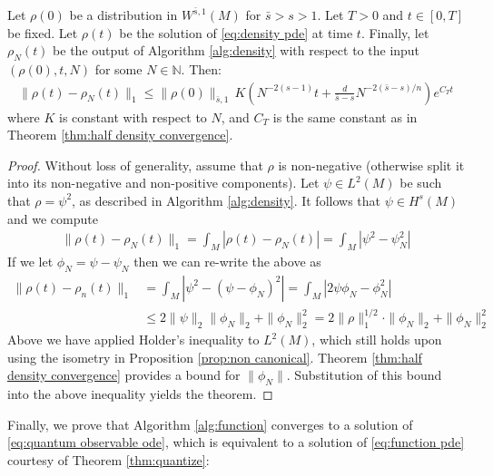 \documentclass[final,leqno]{siamart}
\begin{document}
\begin{theorem} \label{thm:density convergence}
	Let $\rho(0)$ be a distribution in $W^{\bar{s},1}(M)$ for $\bar{s} > s >1$.
	Let $T > 0$ and $t \in [0,T]$ be fixed.
	Let $\rho(t)$ be the solution of \eqref{eq:density pde} at time $t$.
	Finally, let $\rho_{N}(t)$ be the output of Algorithm \ref{alg:density} with respect to the input $(\rho(0), t , N)$ for some $N \in \mathbb{N}$.
	Then:
	\begin{align*}
		\| \rho(t) - \rho_{N}(t) \|_{1} \leq \| \rho(0) \|_{\bar{s},1} \, K \left( N^{-2(s-1)} t+  \frac{d}{\bar{s}-s} N^{-2(\bar{s}-s)/n} \right) e^{C_{T} t}
	\end{align*}
	where $K$ is constant with respect to $N$, and $C_{T}$ is the same constant as in Theorem \ref{thm:half density convergence}.
\end{theorem}

\begin{proof}
	Without loss of generality, assume that $\rho$ is non-negative (otherwise split it into its non-negative and non-positive components).
	Let $\psi \in L^{2}(M)$ be such that $\rho =  \psi ^{2}$, as described in Algorithm \ref{alg:density}.
	It follows that $\psi \in H^{s}(M)$ and we compute
	\begin{align*}
		\| \rho(t) - \rho_{N}(t) \|_{1} = \int_{M} | \rho(t) - \rho_{N}(t)| = \int_{M} | \psi^{2} - \psi_{N}^{2} |
	\end{align*}
	If we let $\phi_{N} = \psi - \psi_{N}$ then we can re-write the above as
	\begin{align*}
		\| \rho(t) - \rho_{n}(t) \|_{1}  &= \int_{M} | \psi^{2} - (\psi - \phi_{N})^{2} | = \int_{M} | 2 \psi \phi_{N} - \phi_{N}^{2} | \\
			&\leq 2 \| \psi \|_{2} \| \phi_{N}\|_{2} + \| \phi_{N} \|_{2}^{2} = 2 \| \rho \|_{1}^{1/2} \cdot \| \phi_{N} \|_{2} + \| \phi_{N} \|_{2}^{2}
	\end{align*}
	Above we have applied Holder's inequality to $L^{2}(M)$, which still holds upon using the isometry in Proposition \ref{prop:non canonical}.
	Theorem \ref{thm:half density convergence} provides a bound for $\| \phi_{N} \|$.
	Substitution of this bound into the above inequality yields the theorem.
\end{proof}

Finally, we prove that Algorithm \ref{alg:function} converges to a solution of \eqref{eq:quantum observable ode}, which is equivalent to a solution of \eqref{eq:function pde} courtesy of Theorem \ref{thm:quantize}:
\end{document}
